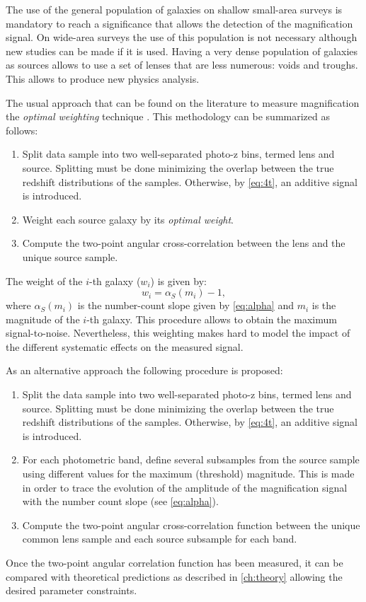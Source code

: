 The use of the general population of galaxies on shallow small-area surveys is mandatory to reach a significance that allows the detection of the magnification signal. On wide-area surveys the use of this population is not necessary although new studies can be made if it is used. Having a very dense population of galaxies as sources allows to use a set of lenses that are less numerous: voids and troughs. This allows to produce new physics analysis.
\newline

The usual approach that can be found on the literature to measure magnification the {\it optimal weighting} technique \cite{2003A&A...403..817M}. This methodology can be summarized as follows:
\begin{enumerate}
\item Split data sample into two well-separated photo-z bins, termed lens and source. Splitting must be done minimizing the overlap between the true redshift distributions of the samples. Otherwise, by \autoref{eq:4t}, an additive signal is introduced.
\item Weight each source galaxy by its {\it optimal weight}.
\item Compute the two-point angular cross-correlation between the lens and the unique source sample.
\end{enumerate}
The weight of the $i$-th galaxy ($w_i$) is given by:
\begin{equation}
w_i = \alpha_S(m_i)-1,
\end{equation}
where $\alpha_S(m_i)$ is the number-count slope given by \autoref{eq:alpha} and $m_i$ is the magnitude of the $i$-th galaxy. This procedure allows to obtain the maximum signal-to-noise. Nevertheless, this weighting makes hard to model the impact of the different systematic effects on the measured signal.
\newline

As an alternative approach the following procedure is proposed:
\begin{enumerate}
	\item Split the data sample into two well-separated photo-z bins, termed lens and source. Splitting must be done minimizing the overlap between the true redshift distributions of the samples. Otherwise, by \autoref{eq:4t}, an additive signal is introduced.
	\item For each photometric band, define several subsamples from the source sample using different values for the maximum (threshold) magnitude. This is made in order to trace the evolution of the amplitude of the magnification signal with the number count slope (see \autoref{eq:alpha}).
	\item Compute the two-point angular cross-correlation function between the unique common lens sample and each source subsample for each band.
\end{enumerate}
Once the two-point angular correlation function has been measured, it can be compared with theoretical predictions as described in \autoref{ch:theory} allowing the desired parameter constraints.
\newline

